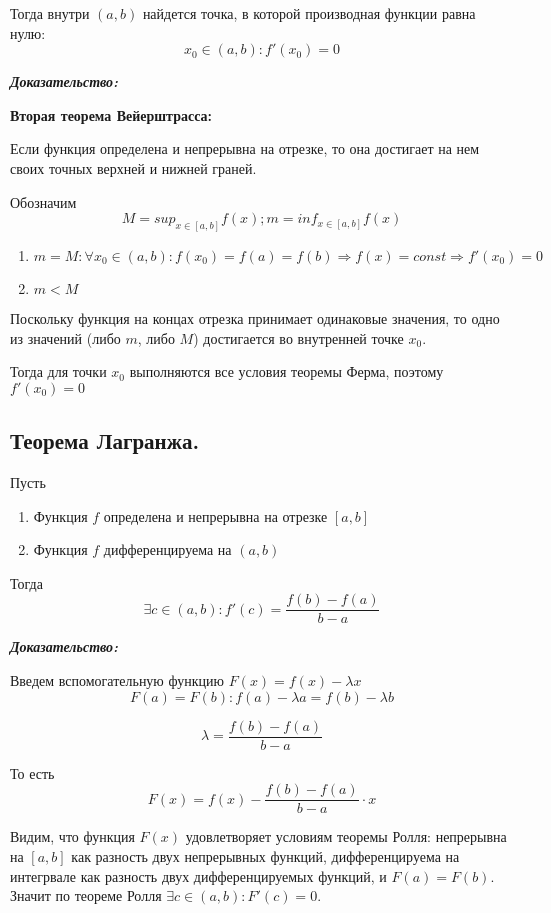 \documentclass[a4paper,12pt]{article}
\theoremstyle{plain} %
\theoremstyle{definition} %
\theoremstyle{remark} %
\begin{document}
Тогда внутри $(a, b)$ найдется точка, в которой производная функции равна нулю:
\[
	x_0 \in (a, b): f'(x_0) = 0
\]

\textit{\textbf{Доказательство:}}

\textbf{Вторая теорема Вейерштрасса:}

Если функция определена и непрерывна на отрезке, то она достигает на нем своих точных верхней и нижней граней.

Обозначим
\[ M = sup_{x \in [a, b]}f(x); m = inf_{x \in [a, b]} f(x) \]

\begin{enumerate}
	\item $m = M: \forall x_0 \in (a, b): f(x_0) = f(a) = f(b) \Rightarrow f(x) = const \Rightarrow f'(x_0) = 0$
	\item $m < M$
\end{enumerate}

Поскольку функция на концах отрезка принимает одинаковые значения, то одно из значений (либо $m$, либо $M$) достигается во внутренней точке $x_0$.

Тогда для точки $x_0$ выполняются все условия теоремы Ферма, поэтому $f'(x_0) = 0$




\newpage
\subsection*{Теорема Лагранжа.                                                                          }

Пусть
\begin{enumerate}
	\item Функция $f$ определена и непрерывна на отрезке $[a, b]$
	\item Функция $f$ дифференцируема на $(a, b)$
\end{enumerate}
Тогда
\[
	\exists c \in (a, b): f'(c) = \frac{f(b) - f(a)}{b - a}
\]

\textit{\textbf{Доказательство:}}

Введем вспомогательную функцию $F(x) = f(x) - \lambda x$
\[
	F(a) = F(b): f(a) - \lambda a = f(b) - \lambda b
\]

\[
	\lambda = \frac{f(b) - f(a)}{b - a}
\]

То есть \[F(x) = f(x) - \frac{f(b) - f(a)}{b - a} \cdot x\]

Видим, что функция $F(x)$ удовлетворяет условиям теоремы Ролля: непрерывна на $[a, b]$ как разность двух непрерывных функций, дифференцируема на интегрвале как разность двух дифференцируемых функций, и $F(a) = F(b)$. Значит по теореме Ролля $\exists c \in (a, b): F'(c) = 0$.
\end{document}
